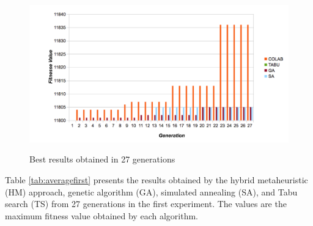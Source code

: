 \documentclass[espaco=umemeio,chapter=TITLE,twoside,openright]{abnt}
\begin{document}
\begin{figure}[h]
\centering
\caption{Best results obtained in 27 generations}
\includegraphics[width=1\textwidth]{./images/generationcomparative.png}
\label{fig:exp1bestresults}
\end{figure}

Table \ref{tab:averagefirst} presents the results obtained by the hybrid metaheuristic (HM) approach, genetic algorithm (GA), simulated annealing (SA), and Tabu search (TS) from 27 generations in the first experiment. The values are the maximum fitness value obtained by each algorithm.
\end{document}
